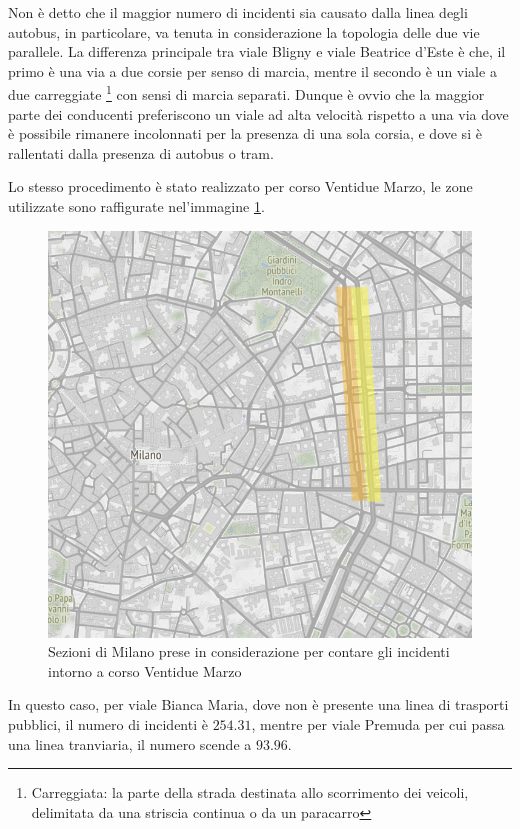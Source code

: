 \documentclass[a4paper]{report}
\begin{document}
Non è detto che il maggior numero di incidenti sia causato dalla linea degli autobus, 
in particolare, va tenuta in considerazione la topologia delle due vie parallele.
La differenza principale tra viale Bligny e viale Beatrice d'Este è che, il primo è una via a due 
corsie per senso di marcia, mentre il secondo è un viale a due carreggiate
\footnote{Carreggiata: la parte della strada destinata allo scorrimento dei veicoli, 
delimitata da una striscia continua o da un paracarro} 
con sensi di marcia separati. 
Dunque è ovvio che la maggior parte dei conducenti preferiscono un viale ad alta velocità rispetto a 
una via dove è possibile rimanere incolonnati per la presenza di una sola corsia, e dove si è 
rallentati dalla presenza di autobus o tram.

Lo stesso procedimento è stato realizzato per corso Ventidue Marzo, le zone utilizzate sono 
raffigurate nel'immagine \ref{fig:zona-22marzo-rect}. 

\begin{figure}
    \includegraphics[width=\linewidth]{../src/atm/zona_22marzo_rect.png}
    \caption{Sezioni di Milano prese in considerazione per contare gli incidenti intorno a corso Ventidue Marzo}
    \label{fig:zona-22marzo-rect}
\end{figure}

In questo caso, per viale Bianca Maria, dove non è presente una linea di trasporti pubblici, 
il numero di incidenti è $254.31$, mentre per viale Premuda per cui passa una linea tranviaria, 
il numero scende a $93.96$.
\end{document}
